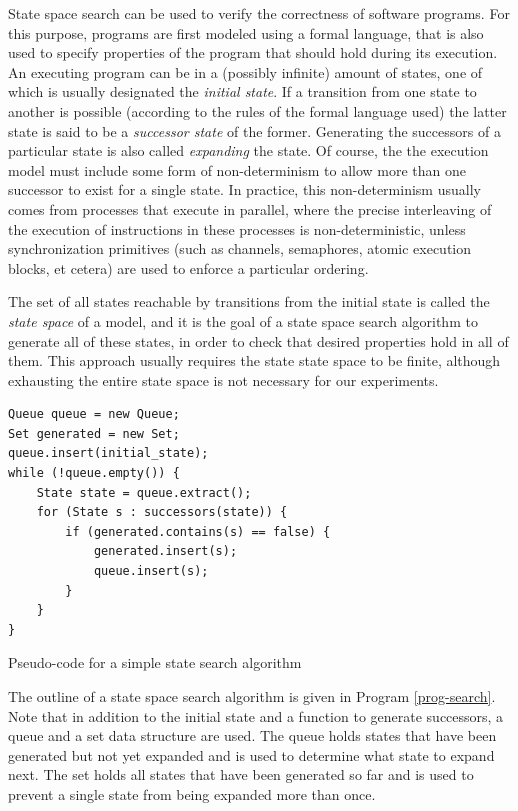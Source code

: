 \documentclass{acm_proc_article-sp}
\begin{document}
State space search can be used to verify the correctness of software programs.
For this purpose, programs are first modeled using a formal language, that is
also used to specify properties of the program that should hold during its
execution. An executing program can be in a (possibly infinite) amount of states,
one of which is usually designated the \emph{initial state}. If a transition
from one state to another is possible (according to the rules of the formal
language used) the latter state is said to be a \emph{successor state} of the
former.
Generating the successors of a particular state is also called
\emph{expanding} the state. Of course, the the execution model
must include some form of non-determinism to allow more than one successor to
exist for a single state.
In practice, this non-determinism usually comes from processes that execute in
parallel, where the precise interleaving of the execution of
instructions in these processes is non-deterministic, unless synchronization
primitives (such as channels, semaphores, atomic execution blocks, et cetera)
are used to enforce a particular ordering.

The set of all states reachable by transitions from the initial state is called
the \emph{state space} of a model, and it is the goal of a state space search
algorithm to generate all of these states, in order to check that desired
properties hold in all of them. This approach usually requires the state state
space to be finite, although exhausting the entire state space is not necessary
for our experiments.

\begin{program}[t]
\begin{verbatim}
Queue queue = new Queue;
Set generated = new Set;
queue.insert(initial_state);
while (!queue.empty()) {
    State state = queue.extract();
    for (State s : successors(state)) {
        if (generated.contains(s) == false) {
            generated.insert(s);
            queue.insert(s);
        }
    }
}
\end{verbatim}
\caption{Pseudo-code for a simple state search algorithm}
\label{prog-search}
\end{program}

The outline of a state space search algorithm is given in Program
\ref{prog-search}. Note that in addition to the initial state and a function
to generate successors, a queue and a set data structure are used. The queue
holds states that have been generated but not yet expanded and is used to
determine what state to expand next. The set holds all states that have been
generated so far and is used to prevent a single state from being expanded
more than once.
\end{document}
